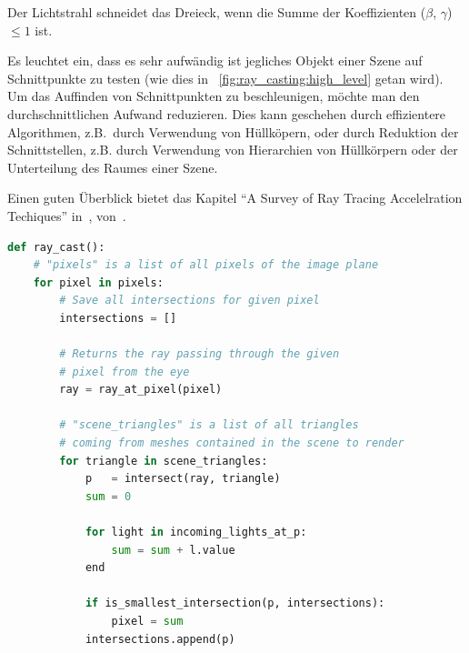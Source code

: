 Der Lichtstrahl schneidet das Dreieck, wenn die Summe der Koeffizienten
($\beta$, $\gamma$) $\le 1$ ist.

Es leuchtet ein, dass es sehr aufwändig ist jegliches Objekt einer Szene
auf Schnittpunkte zu testen (wie dies in
~\autoref{fig:ray_casting:high_level} getan wird). Um das Auffinden von
Schnittpunkten zu beschleunigen, möchte man den durchschnittlichen
Aufwand reduzieren. Dies kann geschehen durch effizientere Algorithmen,
z.B.~durch Verwendung von Hüllköpern, oder durch Reduktion der
Schnittstellen, z.B. durch Verwendung von Hierarchien von Hüllkörpern
oder der Unterteilung des Raumes einer Szene.

Einen guten Überblick bietet das Kapitel ``A Survey of Ray Tracing
Accelelration Techiques'' in~,
von~\cite{glassner_introduction_1989}.

\begin{minipage}{\linewidth}
\begin{lstlisting}[language=Python,caption={Eine abstrakte Umsetzung des Ray
        Casting
Verfahrens\protect\footnotemark.},label={fig:ray_casting:high_level},captionpos=b,emph={ray_cast}]
def ray_cast():
    # "pixels" is a list of all pixels of the image plane
    for pixel in pixels:
        # Save all intersections for given pixel
        intersections = []

        # Returns the ray passing through the given
        # pixel from the eye
        ray = ray_at_pixel(pixel)

        # "scene_triangles" is a list of all triangles
        # coming from meshes contained in the scene to render
        for triangle in scene_triangles:
            p   = intersect(ray, triangle)
            sum = 0

            for light in incoming_lights_at_p:
                sum = sum + l.value
            end

            if is_smallest_intersection(p, intersections):
                pixel = sum
            intersections.append(p)
\end{lstlisting}
\end{minipage}
